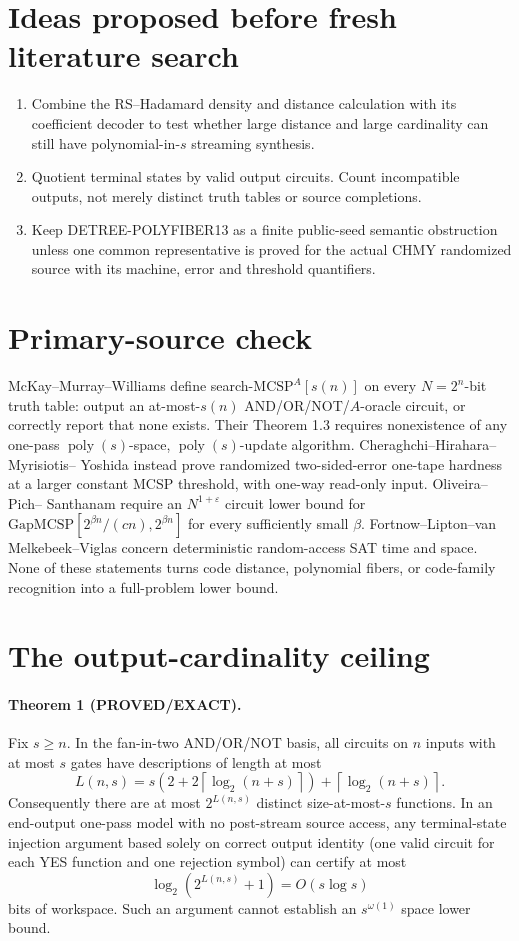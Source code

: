 \documentclass[11pt]{article}
\begin{document}
\section*{Ideas proposed before fresh literature search}
\begin{enumerate}
\item Combine the RS--Hadamard density and distance calculation with its
coefficient decoder to test whether large distance and large cardinality can
still have polynomial-in-$s$ streaming synthesis.
\item Quotient terminal states by valid output circuits.  Count incompatible
outputs, not merely distinct truth tables or source completions.
\item Keep DETREE-POLYFIBER13 as a finite public-seed semantic obstruction
unless one common representative is proved for the actual CHMY randomized
source with its machine, error and threshold quantifiers.
\end{enumerate}

\section*{Primary-source check}
McKay--Murray--Williams define search-$\mathrm{MCSP}^A[s(n)]$ on every
$N=2^n$-bit truth table: output an at-most-$s(n)$ AND/OR/NOT/$A$-oracle
circuit, or correctly report that none exists.  Their Theorem 1.3 requires
nonexistence of any one-pass $\operatorname{poly}(s)$-space,
$\operatorname{poly}(s)$-update algorithm.  Cheraghchi--Hirahara--Myrisiotis--
Yoshida instead prove randomized two-sided-error one-tape hardness at a larger
constant MCSP threshold, with one-way read-only input.  Oliveira--Pich--
Santhanam require an $N^{1+\varepsilon}$ circuit lower bound for
$\mathrm{GapMCSP}[2^{\beta n}/(cn),2^{\beta n}]$ for every sufficiently small
$\beta$.  Fortnow--Lipton--van Melkebeek--Viglas concern deterministic
random-access SAT time and space.  None of these statements turns code
distance, polynomial fibers, or code-family recognition into a full-problem
lower bound.

\section*{The output-cardinality ceiling}
\paragraph{Theorem 1 (\textbf{PROVED/EXACT}).}
Fix $s\ge n$.  In the fan-in-two AND/OR/NOT basis, all circuits on $n$ inputs
with at most $s$ gates have descriptions of length at most
\[
 L(n,s)=s\left(2+2\left\lceil\log_2(n+s)\right\rceil\right)
       +\left\lceil\log_2(n+s)\right\rceil.
\]
Consequently there are at most $2^{L(n,s)}$ distinct size-at-most-$s$
functions.  In an end-output one-pass model with no post-stream source access,
any terminal-state injection argument based solely on correct output identity
(one valid circuit for each YES function and one rejection symbol) can certify
at most
\[
 \log_2(2^{L(n,s)}+1)=O(s\log s)
\]
bits of workspace.  Such an argument cannot establish an
$s^{\omega(1)}$ space lower bound.
\end{document}
